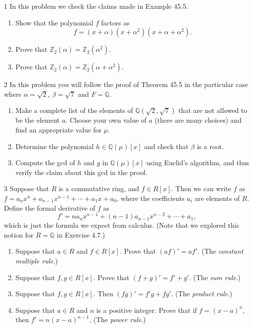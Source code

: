 \begin{problem}{1}
    In this problem we check the claims made in Example 45.5.
    \begin{enumerate}
        \item[(a)] Show that the polynomial $f$ factors as
        \[f = (x + \alpha)(x + \alpha^2)(x + \alpha + \alpha^2).\]
        \item[(b)] Prove that $\mathbb{Z}_2(\alpha) = \mathbb{Z}_2(\alpha^2)$.
        \item[(c)] Prove that $\mathbb{Z}_2(\alpha) = \mathbb{Z}_2(\alpha + \alpha^2)$.
    \end{enumerate}
\end{problem}
\unsolved

\begin{problem}{2}
    In this problem you will follow the proof of Theorem 45.5 in the particular case where
    $\alpha = \sqrt{2}$, $\beta = \sqrt{7}$ and $F = \mathbb{Q}$.
    \begin{enumerate}
        \item[(a)] Make a complete list of the elements of $\mathbb{Q}(\sqrt{2}, \sqrt{7})$
        that are not allowed to be the element $a$. Choose your own value of $a$ (there are
        many choices) and find an appropriate value for $\mu$.
        \item[(b)] Determine the polynomial $h \in \mathbb{Q}(\mu)[x]$ and check that
        $\beta$ is a root.
        \item[(c)] Compute the gcd of $h$ and $g$ in $\mathbb{Q}(\mu)[x]$ using Euclid's
        algorithm, and thus verify the claim about this gcd in the proof.
    \end{enumerate}
\end{problem}
\unsolved

\begin{problem}{3}
    Suppose that $R$ is a commutative ring, and $f \in R[x]$. Then we can write $f$ as
    $f = a_nx^n + a_{n - 1}x^{n - 1} + \cdots + a_1x + a_0$, where the coefficients $a_i$
    are elements of $R$. Define the formal derivative of $f$ as
    \[f' = na_nx^{n - 1} + (n - 1)a_{n - 1}x^{n - 2} + \cdots + a_1,\]
    which is just the formula we expect from calculus. (Note that we explored this notion
    for $R = \mathbb{Q}$ in Exercise 4.7.)
    \begin{enumerate}
        \item[(a)] Suppose that $a \in R$ and $f \in R[x]$. Prove that $(af)' = af'$. (The
        \emph{constant multiple rule}.)
        \item[(b)] Suppose that $f, g \in R[x]$. Prove that $(f + g)' = f' + g'$. (The
        \emph{sum rule}.)
        \item[(c)] Suppose that $f, g \in R[x]$. Then $(fg)' = f'g + fg'$. (The
        \emph{product rule}.)
        \item[(d)] Suppose that $a \in R$ and $n$ is a positive integer. Prove that if
        $f = {(x - a)}^n$, then $f' = n{(x - a)}^{n - 1}$. (The \emph{power rule}.)
    \end{enumerate}
\end{problem}
\unsolved

